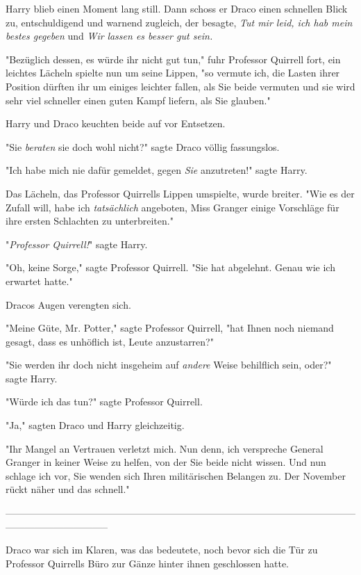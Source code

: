 {Harry blieb einen Moment lang still. Dann schoss er Draco einen schnellen Blick zu, entschuldigend und warnend zugleich, der besagte, \emph{Tut mir leid, ich hab mein bestes gegeben} und \emph{Wir} \emph{lassen es besser gut sein.}

"Bezüglich dessen, es würde ihr nicht gut tun," fuhr Professor Quirrell fort, ein leichtes Lächeln spielte nun um seine Lippen, "so vermute ich, die Lasten ihrer Position dürften ihr um einiges leichter fallen, als Sie beide vermuten und sie wird sehr viel schneller einen guten Kampf liefern, als Sie glauben."

Harry und Draco keuchten beide auf vor Entsetzen.

"Sie \emph{beraten} sie doch wohl nicht?" sagte Draco völlig fassungslos.

"Ich habe mich nie dafür gemeldet, gegen \emph{Sie} anzutreten!" sagte Harry.

Das Lächeln, das Professor Quirrells Lippen umspielte, wurde breiter. "Wie es der Zufall will, habe ich \emph{tatsächlich} angeboten, Miss Granger einige Vorschläge für ihre ersten Schlachten zu unterbreiten."

"\emph{Professor Quirrell!}" sagte Harry.

"Oh, keine Sorge," sagte Professor Quirrell. "Sie hat abgelehnt. Genau wie ich erwartet hatte."

Dracos Augen verengten sich.

"Meine Güte, Mr. Potter," sagte Professor Quirrell, "hat Ihnen noch niemand gesagt, dass es unhöflich ist, Leute anzustarren?"

"Sie werden ihr doch nicht insgeheim auf \emph{andere} Weise behilflich sein, oder?" sagte Harry.

"Würde ich das tun?" sagte Professor Quirrell.

"Ja," sagten Draco und Harry gleichzeitig.

"Ihr Mangel an Vertrauen verletzt mich. Nun denn, ich verspreche General Granger in keiner Weise zu helfen, von der Sie beide nicht wissen. Und nun schlage ich vor, Sie wenden sich Ihren militärischen Belangen zu. Der November rückt näher und das schnell."

--------------------------------------------------------------------------------------------------------------------------------------------

Draco war sich im Klaren, was das bedeutete, noch bevor sich die Tür zu Professor Quirrells Büro zur Gänze hinter ihnen geschlossen hatte.

}
